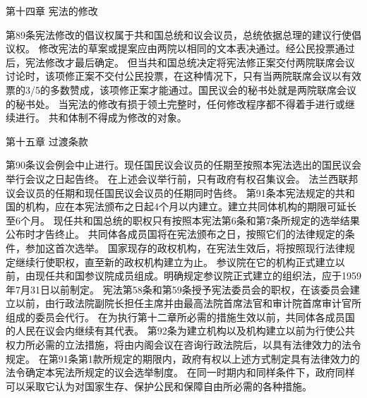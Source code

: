                     第十四章    宪法的修改
 
    第89条宪法修改的倡议权属于共和国总统和议会议员，总统依据总理的建议行使倡议权。
    修改宪法的草案或提案应由两院以相同的文本表决通过。经公民投票通过后，宪法修改才最后确定。
    但当共和国总统决定将宪法修正案交付两院联席会议讨论时，该项修正案不交付公民投票，在这种情况下，只有当两院联席会议以有效票的3/5的多数赞成，该项修正案才能通过。国民议会的秘书处就是两院联席会议的秘书处。
    当宪法的修改有损于领土完整时，任何修改程序都不得着手进行或继续进行。
    共和体制不得成为修改的对象。
 
                      第十五章    过渡条款
 
    第90条议会例会中止进行。现任国民议会议员的任期至按照本宪法选出的国民议会举行会议之日起告终。
    在上述会议举行前，只有政府有权召集议会。
    法兰西联邦议会议员的任期和现任国民议会议员的任期同时告终。
    第91条本宪法规定的共和国的机构，应在本宪法颁布之日起4个月以内建立。建立共同体机构的期限可延长至6个月。
    现任共和国总统的职权只有按照本宪法第6条和第7条所规定的选举结果公布时才告终止。
    共同体各成员国将在宪法颁布之日，按照它们的法律规定的条件，参加这首次选举。
    国家现存的政权机构，在宪法生效后，将按照现行法律规定继续行使职权，直至新的政权机构建立为止。
    参议院在它的机构正式建立以前，由现任共和国参议院成员组成。明确规定参议院正式建立的组织法，应于1959年7月31日以前制定。
    宪法第58条和第59条授予宪法委员会的职权，在该委员会建立以前，由行政法院副院长担任主席并由最高法院首席法官和审计院首席审计官所组成的委员会代行。
    在为执行第十二章所必需的措施生效以前，共同体各成员国的人民在议会内继续有其代表。
    第92条为建立机构以及机构建立以前为行使公共权力所必需的立法措施，将由内阁会议在咨询行政法院后，以具有法律效力的法令规定。
    在第91条第1款所规定的期限内，政府有权以上述方式制定具有法律效力的法令确定本宪法所规定的议会选举制度。
    在同一时期内和同样条件下，政府同样可以采取它认为对国家生存、保护公民和保障自由所必需的各种措施。
                    
